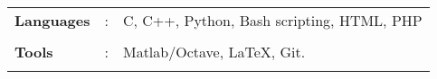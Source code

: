\documentclass[10pt]{article}
\newcommand\hs{1.3mm}		%
\begin{document}
\colorbox{bl}{}\\
\begin{tabular}{m{1in}m{0.20in}m{4.5in}}
	\\[-3mm]
	\hspace{\hs} \hspace{0.12cm}\textbf{\textbf{Languages}} &: & {{C, C++, Python, Bash scripting, HTML, PHP}} \\
	\\[-3.5mm]
	\hspace{\hs} \hspace{0.12cm}\textbf{\textbf{Tools}} &: & {Matlab/Octave, \LaTeX, Git.}\\
	\\[-4mm]
\end{tabular}\\



\colorbox{bl}{}
\end{document}

